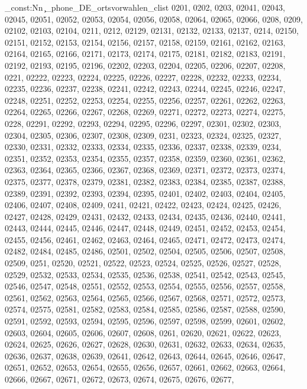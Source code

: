 \clist_const:Nn \c_phone_DE_ortsvorwahlen_clist {0201,
0202,
0203,
02041,
02043,
02045,
02051,
02052,
02053,
02054,
02056,
02058,
02064,
02065,
02066,
0208,
0209,
02102,
02103,
02104,
0211,
0212,
02129,
02131,
02132,
02133,
02137,
0214,
02150,
02151,
02152,
02153,
02154,
02156,
02157,
02158,
02159,
02161,
02162,
02163,
02164,
02165,
02166,
02171,
02173,
02174,
02175,
02181,
02182,
02183,
02191,
02192,
02193,
02195,
02196,
02202,
02203,
02204,
02205,
02206,
02207,
02208,
0221,
02222,
02223,
02224,
02225,
02226,
02227,
02228,
02232,
02233,
02234,
02235,
02236,
02237,
02238,
02241,
02242,
02243,
02244,
02245,
02246,
02247,
02248,
02251,
02252,
02253,
02254,
02255,
02256,
02257,
02261,
02262,
02263,
02264,
02265,
02266,
02267,
02268,
02269,
02271,
02272,
02273,
02274,
02275,
0228,
02291,
02292,
02293,
02294,
02295,
02296,
02297,
02301,
02302,
02303,
02304,
02305,
02306,
02307,
02308,
02309,
0231,
02323,
02324,
02325,
02327,
02330,
02331,
02332,
02333,
02334,
02335,
02336,
02337,
02338,
02339,
0234,
02351,
02352,
02353,
02354,
02355,
02357,
02358,
02359,
02360,
02361,
02362,
02363,
02364,
02365,
02366,
02367,
02368,
02369,
02371,
02372,
02373,
02374,
02375,
02377,
02378,
02379,
02381,
02382,
02383,
02384,
02385,
02387,
02388,
02389,
02391,
02392,
02393,
02394,
02395,
02401,
02402,
02403,
02404,
02405,
02406,
02407,
02408,
02409,
0241,
02421,
02422,
02423,
02424,
02425,
02426,
02427,
02428,
02429,
02431,
02432,
02433,
02434,
02435,
02436,
02440,
02441,
02443,
02444,
02445,
02446,
02447,
02448,
02449,
02451,
02452,
02453,
02454,
02455,
02456,
02461,
02462,
02463,
02464,
02465,
02471,
02472,
02473,
02474,
02482,
02484,
02485,
02486,
02501,
02502,
02504,
02505,
02506,
02507,
02508,
02509,
0251,
02520,
02521,
02522,
02523,
02524,
02525,
02526,
02527,
02528,
02529,
02532,
02533,
02534,
02535,
02536,
02538,
02541,
02542,
02543,
02545,
02546,
02547,
02548,
02551,
02552,
02553,
02554,
02555,
02556,
02557,
02558,
02561,
02562,
02563,
02564,
02565,
02566,
02567,
02568,
02571,
02572,
02573,
02574,
02575,
02581,
02582,
02583,
02584,
02585,
02586,
02587,
02588,
02590,
02591,
02592,
02593,
02594,
02595,
02596,
02597,
02598,
02599,
02601,
02602,
02603,
02604,
02605,
02606,
02607,
02608,
0261,
02620,
02621,
02622,
02623,
02624,
02625,
02626,
02627,
02628,
02630,
02631,
02632,
02633,
02634,
02635,
02636,
02637,
02638,
02639,
02641,
02642,
02643,
02644,
02645,
02646,
02647,
02651,
02652,
02653,
02654,
02655,
02656,
02657,
02661,
02662,
02663,
02664,
02666,
02667,
02671,
02672,
02673,
02674,
02675,
02676,
02677,
}
